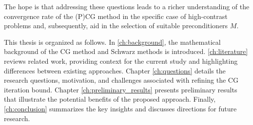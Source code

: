 The hope is that addressing these questions leads to a richer understanding of the convergence rate of the (P)CG method in the specific case of high-contrast problems and, subsequently, aid in the selection of suitable preconditioners $M$.

This thesis is organized as follows. In \cref{ch:background}, the mathematical background of the CG method and Schwarz methods is introduced. \cref{ch:literature} reviews related work, providing context for the current study and highlighting differences between existing approaches. Chapter \ref{ch:questions} details the research questions, motivation, and challenges associated with refining the CG iteration bound. Chapter \ref{ch:preliminary_results} presents preliminary results that illustrate the potential benefits of the proposed approach. Finally, \cref{ch:conclusion} summarizes the key insights and discusses directions for future research.